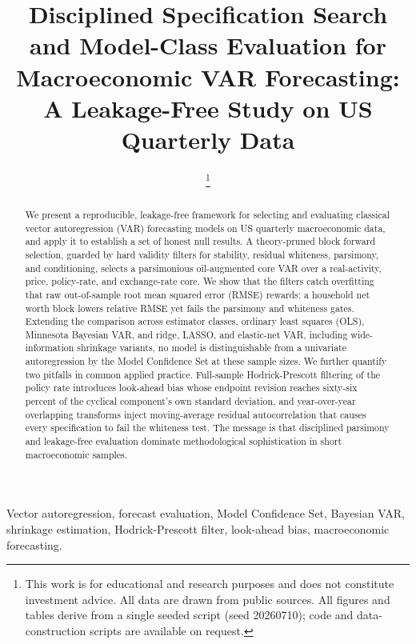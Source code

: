 \documentclass[conference]{IEEEtran}
\begin{document}
\title{Disciplined Specification Search and Model-Class Evaluation for\\ Macroeconomic VAR Forecasting: A Leakage-Free Study on US Quarterly Data}

\author{
%
\thanks{This work is for educational and research purposes and does not constitute investment advice. All data are drawn from public sources. All figures and tables derive from a single seeded script (seed 20260710); code and data-construction scripts are available on request.}}

\maketitle

\begin{abstract}
We present a reproducible, leakage-free framework for selecting and evaluating classical vector autoregression (VAR) forecasting models on US quarterly macroeconomic data, and apply it to establish a set of honest null results. A theory-pruned block forward selection, guarded by hard validity filters for stability, residual whiteness, parsimony, and conditioning, selects a parsimonious oil-augmented core VAR over a real-activity, price, policy-rate, and exchange-rate core. We show that the filters catch overfitting that raw out-of-sample root mean squared error (RMSE) rewards: a household net worth block lowers relative RMSE yet fails the parsimony and whiteness gates. Extending the comparison across estimator classes, ordinary least squares (OLS), Minnesota Bayesian VAR, and ridge, LASSO, and elastic-net VAR, including wide-information shrinkage variants, no model is distinguishable from a univariate autoregression by the Model Confidence Set at these sample sizes. We further quantify two pitfalls in common applied practice. Full-sample Hodrick-Prescott filtering of the policy rate introduces look-ahead bias whose endpoint revision reaches sixty-six percent of the cyclical component's own standard deviation, and year-over-year overlapping transforms inject moving-average residual autocorrelation that causes every specification to fail the whiteness test. The message is that disciplined parsimony and leakage-free evaluation dominate methodological sophistication in short macroeconomic samples.
\end{abstract}

\begin{IEEEkeywords}
Vector autoregression, forecast evaluation, Model Confidence Set, Bayesian VAR, shrinkage estimation, Hodrick-Prescott filter, look-ahead bias, macroeconomic forecasting.
\end{IEEEkeywords}
\end{document}
